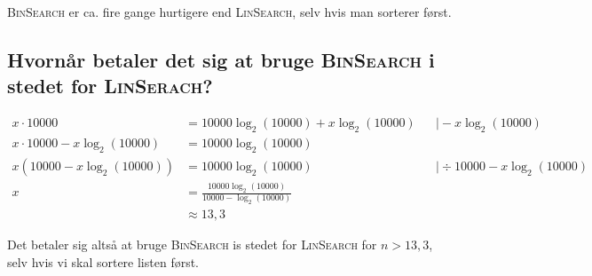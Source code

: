 \textsc{BinSearch} er ca. fire gange hurtigere end \textsc{LinSearch}, selv hvis man sorterer først.

\subsection{Hvornår betaler det sig at bruge \textsc{BinSearch} i stedet for \textsc{LinSerach}?}
\label{subsec:hvornar-betaler-det-sig-at-bruge-binsearch-i-stedet-for-linserach}

\begin{equation}
    \begin{aligned}
        x \cdot 10000                     & = 10000 \log_{2}(10000) + x \log_{2}(10000)             &  & \mid - x \log_{2}(10000)            \\
        x \cdot 10000 - x \log_{2}(10000) & = 10000 \log_{2}(10000)                                                                          \\
        x (10000 - x \log_{2}(10000))     & = 10000 \log_{2}(10000)                                 &  & \mid \div 10000 - x \log_{2}(10000) \\
        x                                 & = \frac{10000 \log_{2}(10000)}{10000 - \log_{2}(10000)}                                          \\
                                          & \approx 13,3
    \end{aligned}
    \label{eq:equation15}
\end{equation}

Det betaler sig altså at bruge \textsc{BinSearch} is stedet for \textsc{LinSearch} for \(n > 13,3\), selv hvis vi skal
sortere listen først.
